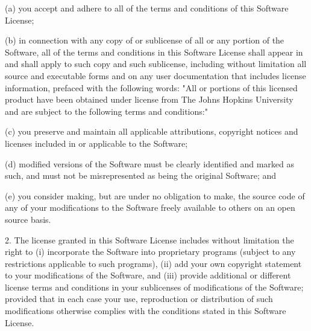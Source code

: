 \begin{DoxyPre}   (a) you accept and adhere to all of the terms and conditions of
       this Software License;\end{DoxyPre}



\begin{DoxyPre}   (b) in connection with any copy of or sublicense of all or any
       portion of the Software, all of the terms and conditions in
       this Software License shall appear in and shall apply to such
       copy and such sublicense, including without limitation all
       source and executable forms and on any user documentation that
       includes license information, prefaced with the following
       words: "All or portions of this licensed product have been
       obtained under license from The Johns Hopkins University and
       are subject to the following terms and conditions:"\end{DoxyPre}



\begin{DoxyPre}   (c) you preserve and maintain all applicable attributions,
       copyright notices and licenses included in or applicable to the
       Software;\end{DoxyPre}



\begin{DoxyPre}   (d) modified versions of the Software must be clearly identified
       and marked as such, and must not be misrepresented as being the
       original Software; and\end{DoxyPre}



\begin{DoxyPre}   (e) you consider making, but are under no obligation to make, the
       source code of any of your modifications to the Software freely
       available to others on an open source basis.\end{DoxyPre}



\begin{DoxyPre}2. The license granted in this Software License includes without
   limitation the right to (i) incorporate the Software into
   proprietary programs (subject to any restrictions applicable to
   such programs), (ii) add your own copyright statement to your
   modifications of the Software, and (iii) provide additional or
   different license terms and conditions in your sublicenses of
   modifications of the Software; provided that in each case your use,
   reproduction or distribution of such modifications otherwise
   complies with the conditions stated in this Software License.\end{DoxyPre}



